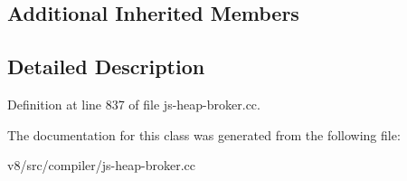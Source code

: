 \subsection*{Additional Inherited Members}


\subsection{Detailed Description}


Definition at line 837 of file js-\/heap-\/broker.\+cc.



The documentation for this class was generated from the following file\+:\begin{DoxyCompactItemize}
\item 
v8/src/compiler/js-\/heap-\/broker.\+cc\end{DoxyCompactItemize}
